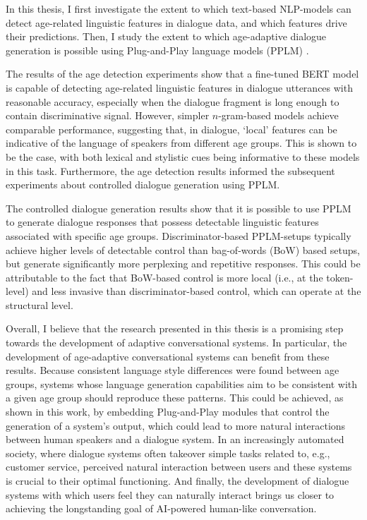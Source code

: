 
In this thesis, I first investigate the extent to which text-based NLP-models can detect age-related linguistic features in dialogue data, and which features drive their predictions. Then, I study the extent to which age-adaptive dialogue generation is possible using Plug-and-Play language models (PPLM) \citep{dathathri2019plug}.

The results of the age detection experiments show that a fine-tuned BERT model is capable of detecting age-related linguistic features in dialogue utterances with reasonable accuracy, especially when the dialogue fragment is long enough to contain discriminative signal. However, simpler $n$-gram-based models achieve comparable performance, suggesting that, in dialogue, ‘local’ features can be indicative of the language of speakers from different age groups. This is shown to be the case, with both lexical and stylistic cues being informative to these models in this task. Furthermore, the age detection results informed the subsequent experiments about controlled dialogue generation using PPLM.

The controlled dialogue generation results show that it is possible to use PPLM to generate dialogue responses that possess detectable linguistic features associated with specific age groups. Discriminator-based PPLM-setups typically achieve higher levels of detectable control 
than bag-of-words (BoW) based setups, but generate significantly more perplexing and repetitive responses. This could be attributable to the fact that BoW-based control is more local (i.e., at the token-level) and less invasive than discriminator-based control, which can operate at the structural level. 

Overall, I believe that the research presented in this thesis is a promising step towards the development of adaptive conversational systems. In particular, the development of age-adaptive conversational systems can benefit from these results. Because consistent language style differences were found between age groups, systems whose language generation capabilities aim to be consistent with a given age group should reproduce these patterns. This could be achieved, as shown in this work, by embedding Plug-and-Play modules that control the generation of a system’s output, which could lead to more natural interactions between human speakers and a dialogue system. 
In an increasingly automated society, where dialogue systems often takeover simple tasks related to, e.g., customer service, perceived natural interaction between users and these systems is crucial to their optimal functioning.
And finally, the development of dialogue systems with which users feel they can naturally interact brings us closer to achieving the longstanding goal of AI-powered human-like conversation.

